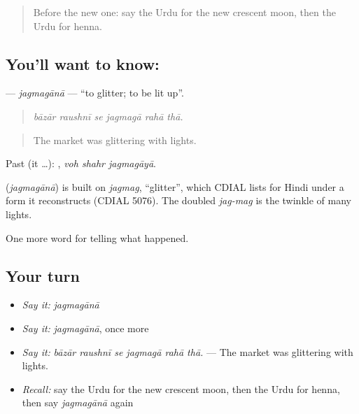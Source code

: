 \label{lesson:UR-C317-jagmagana}



\begin{quote}
Before the new one: say the Urdu for the new crescent moon, then the Urdu for henna.
\end{quote}

\subsection*{You'll want to know: }
\textbf{} — \emph{jagmagānā} — \textquotedblleft{}to glitter; to be lit up\textquotedblright{}.

\begin{quote}
     
\end{quote}

\begin{quote}
\emph{bāzār raushnī se jagmagā rahā thā.}
\end{quote}

\begin{quote}
The market was glittering with lights.
\end{quote}

Past (it …):   , \emph{voh shahr jagmagāyā}.

\begin{cousinweb}
\textbf{} (\emph{jagmagānā}) is built on \emph{jagmag}, \textquotedblleft{}glitter\textquotedblright{}, which CDIAL lists for Hindi under a form it reconstructs (CDIAL 5076). The doubled \emph{jag-mag} is the twinkle of many lights.
\end{cousinweb}

\begin{grammarlens}[title={What you've built}]
One more word for telling what happened.
\end{grammarlens}

\subsection*{Your turn}
\begin{itemize}
\raggedright
  \item \emph{Say it:} \emph{jagmagānā}
  \item \emph{Say it:} \emph{jagmagānā}, once more
  \item \emph{Say it:} \emph{bāzār raushnī se jagmagā rahā thā.} — The market was glittering with lights.
  \item \emph{Recall:} say the Urdu for the new crescent moon, then the Urdu for henna, then say \emph{jagmagānā} again
\end{itemize}

